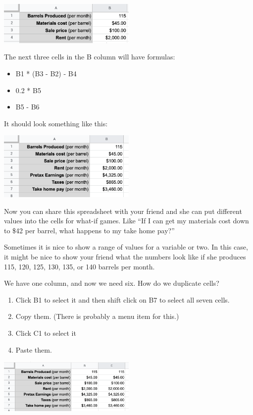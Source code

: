 \includegraphics[width=0.5\textwidth]{BarrelValues.png}

The next three cells in the B column will have formulas:
\begin{itemize}
\item{B1 * (B3 - B2) - B4}
\item{0.2 * B5}
\item{B5 - B6}
\end{itemize}

It should look something like this:

\includegraphics[width=0.5\textwidth]{BarrelFormulas.png}

Now you can share this spreadsheet with your friend and she can put
different values into the cells for what-if games.  Like ``If I can
get my materials cost down to \$42 per barrel, what happens to my take
home pay?''

Sometimes it is nice to show a range of values for a variable or two.
In this case, it might be nice to show your friend what the numbers
look like if she produces 115, 120, 125, 130, 135, or 140 barrels per
month.

We have one column, and now we need six. How do we duplicate cells?
\begin{enumerate}
\item Click B1 to select it and then shift click on B7 to select all seven cells.
\item Copy them. (There is probably a menu item for this.)
\item Click C1 to select it
\item Paste them.
\end{enumerate}

\includegraphics[width=0.5\textwidth]{BarrelCopyPaste.png}

